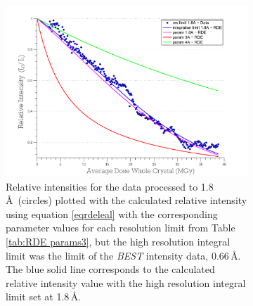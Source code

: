 \begin{figure}
\ContinuedFloat
    \begin{subfigure}[b]{1\textwidth}
        \centering
        \includegraphics[width=\textwidth]{figures/dwd/rescmpplot3.pdf}
        \caption{Relative intensities for the data processed to 1.8\,\AA\ (circles) plotted with the calculated relative intensity using equation \ref{eqrdeleal} with the corresponding parameter values for each resolution limit from Table \ref{tab:RDE params3}, but the high resolution integral limit was the limit of the \emph{BEST} intensity data, 0.66$\,$\AA. The blue solid line corresponds to the calculated relative intensity value with the high resolution integral limit set at 1.8$\,$\AA.}
        \label{fig:Resolution comparison plot - integrated to diff res}
    \end{subfigure}
	\caption[Effects of resolution cut offs on Leal \textit{et al.} model.]{}
	\label{figrescont1}
\end{figure}
